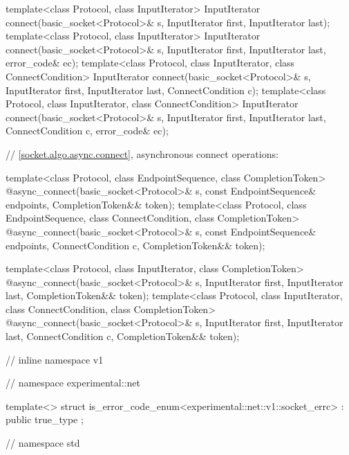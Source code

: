 \begin{codeblock}
{{{  template<class Protocol, class InputIterator>
    InputIterator connect(basic_socket<Protocol>& s,
                          InputIterator first, InputIterator last);
  template<class Protocol, class InputIterator>
    InputIterator connect(basic_socket<Protocol>& s,
                          InputIterator first, InputIterator last,
                          error_code& ec);
  template<class Protocol, class InputIterator, class ConnectCondition>
    InputIterator connect(basic_socket<Protocol>& s,
                          InputIterator first, InputIterator last,
                          ConnectCondition c);
  template<class Protocol, class InputIterator, class ConnectCondition>
    InputIterator connect(basic_socket<Protocol>& s,
                          InputIterator first, InputIterator last,
                          ConnectCondition c,
                          error_code& ec);

  // \ref{socket.algo.async.connect}, asynchronous connect operations:

  template<class Protocol, class EndpointSequence, class CompletionToken>
    @\DEDUCED@ async_connect(basic_socket<Protocol>& s,
                          const EndpointSequence& endpoints,
                          CompletionToken&& token);
  template<class Protocol, class EndpointSequence, class ConnectCondition,
           class CompletionToken>
    @\DEDUCED@ async_connect(basic_socket<Protocol>& s,
                          const EndpointSequence& endpoints,
                          ConnectCondition c,
                          CompletionToken&& token);

  template<class Protocol, class InputIterator, class CompletionToken>
    @\DEDUCED@ async_connect(basic_socket<Protocol>& s,
                          InputIterator first, InputIterator last,
                          CompletionToken&& token);
  template<class Protocol, class InputIterator, class ConnectCondition,
           class CompletionToken>
    @\DEDUCED@ async_connect(basic_socket<Protocol>& s,
                          InputIterator first, InputIterator last,
                          ConnectCondition c,
                          CompletionToken&& token);

} // inline namespace v1
} // namespace experimental::net

  template<> struct is_error_code_enum<experimental::net::v1::socket_errc>
    : public true_type {};

} // namespace std
\end{codeblock}

